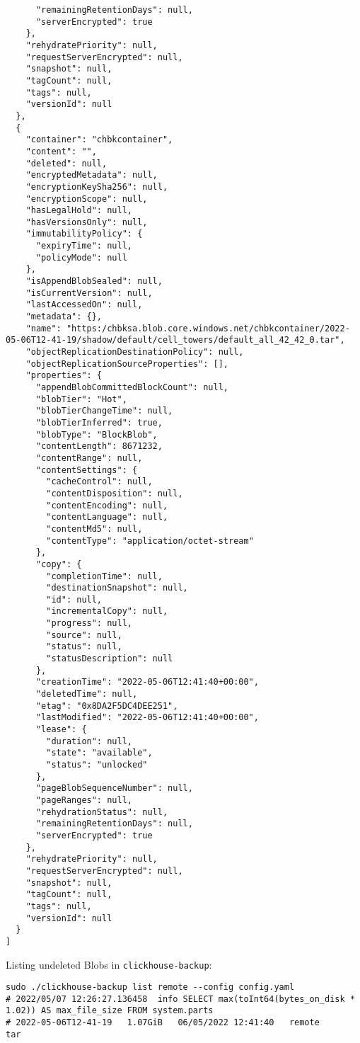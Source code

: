 \begin{verbatim}
      "remainingRetentionDays": null,
      "serverEncrypted": true
    },
    "rehydratePriority": null,
    "requestServerEncrypted": null,
    "snapshot": null,
    "tagCount": null,
    "tags": null,
    "versionId": null
  },
  {
    "container": "chbkcontainer",
    "content": "",
    "deleted": null,
    "encryptedMetadata": null,
    "encryptionKeySha256": null,
    "encryptionScope": null,
    "hasLegalHold": null,
    "hasVersionsOnly": null,
    "immutabilityPolicy": {
      "expiryTime": null,
      "policyMode": null
    },
    "isAppendBlobSealed": null,
    "isCurrentVersion": null,
    "lastAccessedOn": null,
    "metadata": {},
    "name": "https:/chbksa.blob.core.windows.net/chbkcontainer/2022-05-06T12-41-19/shadow/default/cell_towers/default_all_42_42_0.tar",
    "objectReplicationDestinationPolicy": null,
    "objectReplicationSourceProperties": [],
    "properties": {
      "appendBlobCommittedBlockCount": null,
      "blobTier": "Hot",
      "blobTierChangeTime": null,
      "blobTierInferred": true,
      "blobType": "BlockBlob",
      "contentLength": 8671232,
      "contentRange": null,
      "contentSettings": {
        "cacheControl": null,
        "contentDisposition": null,
        "contentEncoding": null,
        "contentLanguage": null,
        "contentMd5": null,
        "contentType": "application/octet-stream"
      },
      "copy": {
        "completionTime": null,
        "destinationSnapshot": null,
        "id": null,
        "incrementalCopy": null,
        "progress": null,
        "source": null,
        "status": null,
        "statusDescription": null
      },
      "creationTime": "2022-05-06T12:41:40+00:00",
      "deletedTime": null,
      "etag": "0x8DA2F5DC4DEE251",
      "lastModified": "2022-05-06T12:41:40+00:00",
      "lease": {
        "duration": null,
        "state": "available",
        "status": "unlocked"
      },
      "pageBlobSequenceNumber": null,
      "pageRanges": null,
      "rehydrationStatus": null,
      "remainingRetentionDays": null,
      "serverEncrypted": true
    },
    "rehydratePriority": null,
    "requestServerEncrypted": null,
    "snapshot": null,
    "tagCount": null,
    "tags": null,
    "versionId": null
  }
]
\end{verbatim}

Listing undeleted Blobs in \texttt{clickhouse-backup}:
\begin{verbatim}
sudo ./clickhouse-backup list remote --config config.yaml
# 2022/05/07 12:26:27.136458  info SELECT max(toInt64(bytes_on_disk * 1.02)) AS max_file_size FROM system.parts
# 2022-05-06T12-41-19   1.07GiB   06/05/2022 12:41:40   remote      tar
\end{verbatim}

